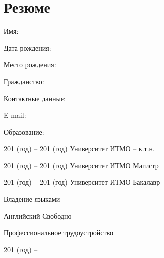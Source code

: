 \chapter*{Резюме}
	Имя:

	Дата рождения:

	Место рождения:

	Гражданство:

Контактные данные:

	E-mail:

Образование:

201 (год) – 201 (год) Университет ИТМО – к.т.н.

201 (год) – 201 (год) Университет ИТМО Магистр

201 (год) – 201 (год) Университет ИТМО Бакалавр

Владение языками

Английский Свободно

Профессиональное трудоустройство

201 (год) –
